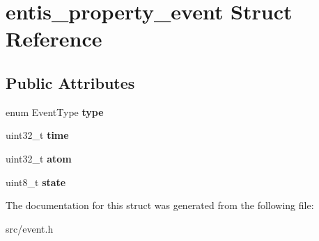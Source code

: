 \hypertarget{structentis__property__event}{}\section{entis\+\_\+property\+\_\+event Struct Reference}
\label{structentis__property__event}
\subsection*{Public Attributes}
\begin{DoxyCompactItemize}
\item 
\mbox{\label{structentis__property__event_a5a827cdeeebde9bd07d030bc8587bdbf}} 
enum Event\+Type {\bfseries type}
\item 
\mbox{\label{structentis__property__event_a5e75e2f9da15d72d7e7ebc519752ad31}} 
uint32\+\_\+t {\bfseries time}
\item 
\mbox{\label{structentis__property__event_a18bac95d9c77019689226b9d0ebf04e7}} 
uint32\+\_\+t {\bfseries atom}
\item 
\mbox{\label{structentis__property__event_a0c99abf727624f98a8b30361fe13caef}} 
uint8\+\_\+t {\bfseries state}
\end{DoxyCompactItemize}


The documentation for this struct was generated from the following file\+:\begin{DoxyCompactItemize}
\item 
src/event.\+h\end{DoxyCompactItemize}
